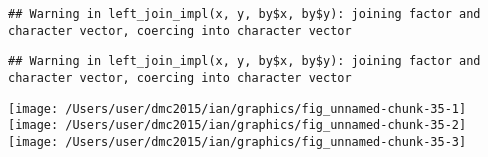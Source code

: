\documentclass[10pt]{report}
\newenvironment{Shaded}{}{}
\newcommand{\KeywordTok}[1]{\textcolor[rgb]{0.00,0.44,0.13}{\textbf{{#1}}}}
\newcommand{\DataTypeTok}[1]{\textcolor[rgb]{0.56,0.13,0.00}{{#1}}}
\newcommand{\StringTok}[1]{\textcolor[rgb]{0.25,0.44,0.63}{{#1}}}
\newcommand{\NormalTok}[1]{{#1}}
\begin{document}
\begin{verbatim}
## Warning in left_join_impl(x, y, by$x, by$y): joining factor and character vector, coercing into character vector
\end{verbatim}

\begin{Shaded}
\end{Shaded}

\begin{verbatim}
## Warning in left_join_impl(x, y, by$x, by$y): joining factor and character vector, coercing into character vector
\end{verbatim}

\begin{Shaded}
\end{Shaded}

\begin{center}\texttt{[image: /Users/user/dmc2015/ian/graphics/fig\_unnamed-chunk-35-1]} \texttt{[image: /Users/user/dmc2015/ian/graphics/fig\_unnamed-chunk-35-2]} \texttt{[image: /Users/user/dmc2015/ian/graphics/fig\_unnamed-chunk-35-3]} \end{center}
\end{document}
